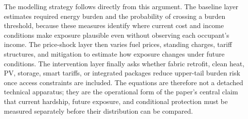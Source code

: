 The modelling strategy follows directly from this argument. The baseline layer estimates required energy burden and the probability of crossing a burden threshold, because these measures identify where current cost and income conditions make exposure plausible even without observing each occupant's income. The price-shock layer then varies fuel prices, standing charges, tariff structures, and mitigation to estimate how exposure changes under future conditions. The intervention layer finally asks whether fabric retrofit, clean heat, PV, storage, smart tariffs, or integrated packages reduce upper-tail burden risk once access constraints are included. The equations are therefore not a detached technical apparatus; they are the operational form of the paper's central claim that current hardship, future exposure, and conditional protection must be measured separately before their distribution can be compared.
